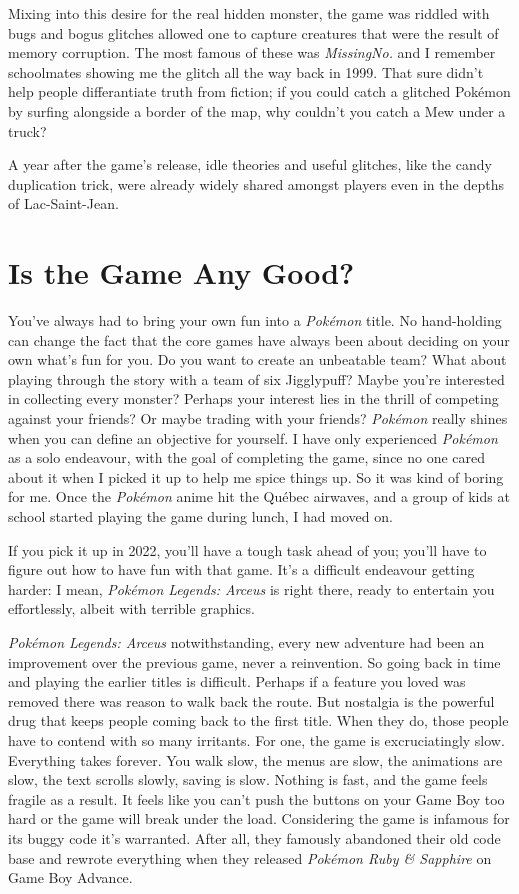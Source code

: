 \documentclass{book}
\begin{document}
Mixing into this desire for the real hidden monster, the game was riddled with bugs and bogus glitches allowed one to capture creatures that were the result of memory corruption. The most famous of these was \emph{MissingNo.} and I remember schoolmates showing me the glitch all the way back in 1999. That sure didn’t help people differantiate truth from fiction; if you could catch a glitched Pokémon by surfing alongside a border of the map, why couldn’t you catch a Mew under a truck?

A year after the game’s release, idle theories and useful glitches, like the candy duplication trick, were already widely shared amongst players even in the depths of Lac-Saint-Jean.

\FloatBarrier\needspace{10mm}\section*{Is the Game Any Good?}\nopagebreak[4]

You’ve always had to bring your own fun into a \emph{Pokémon} title. No hand-holding can change the fact that the core games have always been about deciding on your own what’s fun for you. Do you want to create an unbeatable team? What about playing through the story with a team of six Jigglypuff? Maybe you’re interested in collecting every monster? Perhaps your interest lies in the thrill of competing against your friends? Or maybe trading with your friends? \emph{Pokémon} really shines when you can define an objective for yourself. I have only experienced \emph{Pokémon} as a solo endeavour, with the goal of completing the game, since no one cared about it when I picked it up to help me spice things up. So it was kind of boring for me. Once the \emph{Pokémon} anime hit the Québec airwaves, and a group of kids at school started playing the game during lunch, I had moved on.

If you pick it up in 2022, you’ll have a tough task ahead of you; you’ll have to figure out how to have fun with that game. It’s a difficult endeavour getting harder: I mean, \emph{Pokémon Legends: Arceus} is right there, ready to entertain you effortlessly, albeit with terrible graphics.

\emph{Pokémon Legends: Arceus} notwithstanding, every new adventure had been an improvement over the previous game, never a reinvention. So going back in time and playing the earlier titles is difficult. Perhaps if a feature you loved was removed there was reason to walk back the route. But nostalgia is the powerful drug that keeps people coming back to the first title. When they do, those people have to contend with so many irritants. For one, the game is excruciatingly slow. Everything takes forever. You walk slow, the menus are slow, the animations are slow, the text scrolls slowly, saving is slow. Nothing is fast, and the game feels fragile as a result. It feels like you can’t push the buttons on your Game Boy too hard or the game will break under the load. Considering the game is infamous for its buggy code it’s warranted. After all, they famously abandoned their old code base and rewrote everything when they released \emph{Pokémon Ruby \& Sapphire} on Game Boy Advance.
\end{document}
